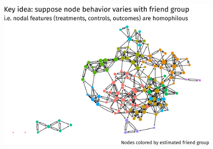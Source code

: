 \documentclass{beamer}
\theoremstyle{remark}
\begin{document}
\begin{frame}
    \centering
    \vspace{3mm}
    \begin{figure}
        \includegraphics[width=\textwidth]{figures/glasgow-friendgroups.png}
    \end{figure}
\end{frame}
\end{document}
